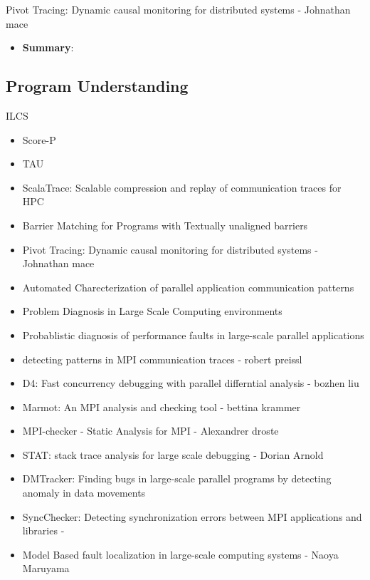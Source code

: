 Pivot Tracing: Dynamic causal monitoring for distributed systems - Johnathan mace \cite{pivot} 
\begin{itemize}
\item \textbf{Summary}: 



\end{itemize}


\subsection{Program Understanding }


ILCS \cite{ilcs}
\begin{itemize}
\item Score-P \cite{scorep}
\item TAU \cite{tau}
\item ScalaTrace: Scalable compression and replay of communication traces for HPC  \cite{scalatrace}
\item Barrier Matching for Programs with Textually unaligned barriers \cite{zhang07}
\item Pivot Tracing: Dynamic causal monitoring for distributed systems - Johnathan mace \cite{pivot}
\item Automated Charecterization of parallel application communication patterns \cite{roth-15}
\item Problem Diagnosis in Large Scale Computing environments \cite{miller06}
\item Probablistic diagnosis of performance faults in large-scale parallel applications \cite{laguna-12}
\item detecting patterns in MPI communication traces - robert preissl \cite{preissl-08}
\item D4: Fast concurrency debugging with parallel differntial analysis - bozhen liu \cite{liu-18}
\item Marmot: An MPI analysis and checking tool - bettina krammer \cite{marmot}
\item MPI-checker - Static Analysis for MPI - Alexandrer droste \cite{mpi-checker}
\item STAT: stack trace analysis for large scale debugging - Dorian Arnold \cite{stat}
\item DMTracker: Finding bugs in large-scale parallel programs by detecting anomaly in data movements \cite{dmtracker}
\item SyncChecker: Detecting synchronization errors between MPI applications and libraries - \cite{syncChecker}
\item Model Based fault localization in large-scale computing systems - Naoya Maruyama \cite{satoshi-08}

\end{itemize}
